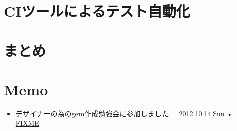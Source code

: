 \documentclass[t, aspectratio=169]{beamer}
\begin{document}
\part{CIツールによるテスト自動化}
\label{sec-6}

\part{まとめ}
\label{sec-7}
\part{Memo}
\label{sec-8}
\begin{itemize}
\item \href{http://atodekaku.tumblr.com/post/33835003602/gem-2012-10-14-sun}{デザイナーの為のgem作成勉強会に参加しました = 2012.10.14.Sun • FIXME}
\end{itemize}
\end{document}
